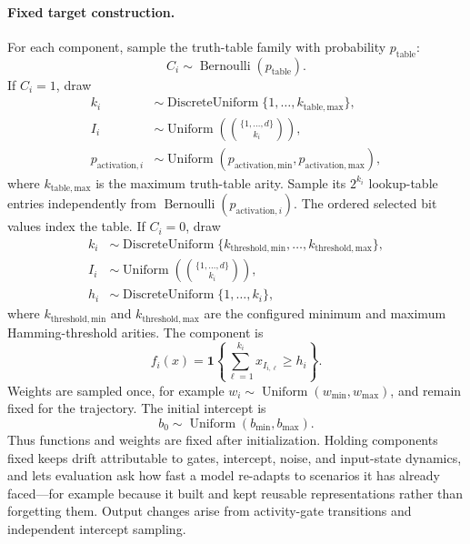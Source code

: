 \documentclass[11pt]{article}
\begin{document}
\paragraph{Fixed target construction.}
For each component, sample the truth-table family with probability
$p_{\mathrm{table}}$:
\[
 C_i\sim\operatorname{Bernoulli}(p_{\mathrm{table}}).
\]
If $C_i=1$, draw
\[
\begin{aligned}
 k_i &\sim\operatorname{DiscreteUniform}
       \{1,\ldots,k_{\mathrm{table,max}}\},\\
 I_i &\sim\operatorname{Uniform}\!\left(
       \binom{\{1,\ldots,d\}}{k_i}\right),\\
 p_{\mathrm{activation},i} &\sim\operatorname{Uniform}
       (p_{\mathrm{activation,min}},p_{\mathrm{activation,max}}),
\end{aligned}
\]
where $k_{\mathrm{table,max}}$ is the maximum truth-table arity.
Sample its $2^{k_i}$ lookup-table entries independently from
$\operatorname{Bernoulli}(p_{\mathrm{activation},i})$.  The ordered selected
bit values index the table.
If $C_i=0$, draw
\[
\begin{aligned}
 k_i &\sim\operatorname{DiscreteUniform}
       \{k_{\mathrm{threshold,min}},\ldots,
         k_{\mathrm{threshold,max}}\},\\
 I_i &\sim\operatorname{Uniform}\!\left(
       \binom{\{1,\ldots,d\}}{k_i}\right),\\
 h_i &\sim\operatorname{DiscreteUniform}\{1,\ldots,k_i\},
\end{aligned}
\]
where $k_{\mathrm{threshold,min}}$ and
$k_{\mathrm{threshold,max}}$ are the configured minimum and maximum
Hamming-threshold arities.  The component is
\[
 f_i(x)=\mathbf{1}\!\left\{
 \sum_{\ell=1}^{k_i}x_{I_{i,\ell}}\geq h_i
 \right\}.
\]
Weights are sampled once, for example
$w_i\sim\operatorname{Uniform}(w_{\min},w_{\max})$, and remain fixed for the
trajectory.  The initial intercept is
\[
 b_0\sim\operatorname{Uniform}(b_{\min},b_{\max}).
\]
Thus functions and weights are fixed after initialization.  Holding components
fixed keeps drift attributable to gates, intercept, noise, and input-state
dynamics, and lets evaluation ask how fast a model re-adapts to scenarios it
has already faced---for example because it built and kept reusable
representations rather than forgetting them.  Output changes arise from
activity-gate transitions and independent intercept sampling.
\end{document}
